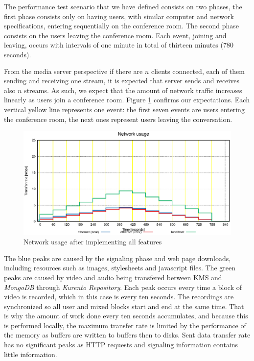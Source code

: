 \documentclass[conference,compsoc,a4paper]{IEEEtran}
\begin{document}
      The performance test scenario that we have defined consists on two phases, the first phase consists only on having users, with similar computer and network specifications, entering sequentially on the conference room. The second phase consists on the users leaving the conference room. Each event, joining and leaving, occurs with intervals of one minute in total of thirteen minutes (780 seconds).
  
      From the media server perspective if there are $n$ clients connected, each of them sending and receiving one stream, it is expected that server sends and receives also $n$ streams. As such, we expect that the amount of network traffic increases linearly as users join a conference room. Figure \ref{fig:test_full_features_net} confirms our expectations. Each vertical yellow line represents one event: the first seven events are users entering the conference room, the next ones represent users leaving the conversation. 
     

\begin{figure}
  \centering
  \includegraphics[width=\linewidth]{stats/test_full_features_net.eps}
  \caption{Network usage after implementing all features}
  \label{fig:test_full_features_net}
\end{figure}


      The blue peaks are caused by the signaling phase and web page downloads, including resources such as images, stylesheets and javascript files. 
      The green peaks are caused by video and audio being transfered between \gls{KMS} and \emph{MongoDB} through \emph{Kurento Repository}. Each peak occurs every time a block of video is recorded, which in this case is every ten seconds. 
      The recordings are synchronized so all user and mixed blocks start and end at the same time. That is why the amount of work done every ten seconds accumulates, and because this is performed locally, the maximum transfer rate is limited by the performance of the memory as buffers are written to buffers then to disks. 
      Sent data transfer rate has no significant peaks as \gls{HTTP} requests and signaling information contains little information.
\end{document}
